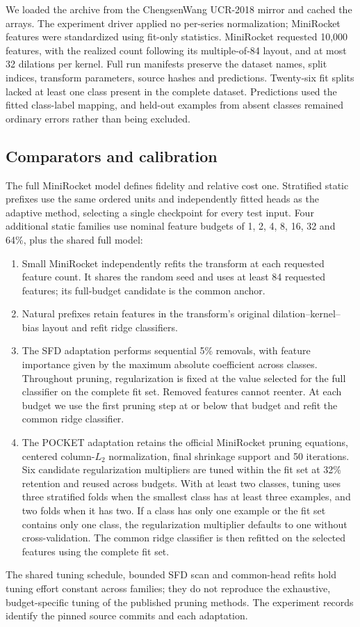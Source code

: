 \documentclass[pdflatex,sn-basic,Numbered]{sn-jnl}
\begin{document}
We loaded the archive from the ChengsenWang UCR-2018 mirror and cached the arrays. The experiment driver applied no per-series normalization; MiniRocket features were standardized using fit-only statistics. MiniRocket requested 10,000 features, with the realized count following its multiple-of-84 layout, and at most 32 dilations per kernel. Full run manifests preserve the dataset names, split indices, transform parameters, source hashes and predictions. Twenty-six fit splits lacked at least one class present in the complete dataset. Predictions used the fitted class-label mapping, and held-out examples from absent classes remained ordinary errors rather than being excluded.

\subsection{Comparators and calibration}
The full MiniRocket model defines fidelity and relative cost one. Stratified static prefixes use the same ordered units and independently fitted heads as the adaptive method, selecting a single checkpoint for every test input. Four additional static families use nominal feature budgets of 1, 2, 4, 8, 16, 32 and 64\%, plus the shared full model:
\begin{enumerate}
 \item Small MiniRocket independently refits the transform at each requested feature count. It shares the random seed and uses at least 84 requested features; its full-budget candidate is the common anchor.
 \item Natural prefixes retain features in the transform's original dilation--kernel--bias layout and refit ridge classifiers.
 \item The SFD adaptation performs sequential 5\% removals, with feature importance given by the maximum absolute coefficient across classes. Throughout pruning, regularization is fixed at the value selected for the full classifier on the complete fit set. Removed features cannot reenter. At each budget we use the first pruning step at or below that budget and refit the common ridge classifier.
 \item The POCKET adaptation retains the official MiniRocket pruning equations, centered column-$L_2$ normalization, final shrinkage support and 50 iterations. Six candidate regularization multipliers are tuned within the fit set at 32\% retention and reused across budgets. With at least two classes, tuning uses three stratified folds when the smallest class has at least three examples, and two folds when it has two. If a class has only one example or the fit set contains only one class, the regularization multiplier defaults to one without cross-validation. The common ridge classifier is then refitted on the selected features using the complete fit set.
\end{enumerate}
The shared tuning schedule, bounded SFD scan and common-head refits hold tuning effort constant across families; they do not reproduce the exhaustive, budget-specific tuning of the published pruning methods. The experiment records identify the pinned source commits and each adaptation.
\end{document}
